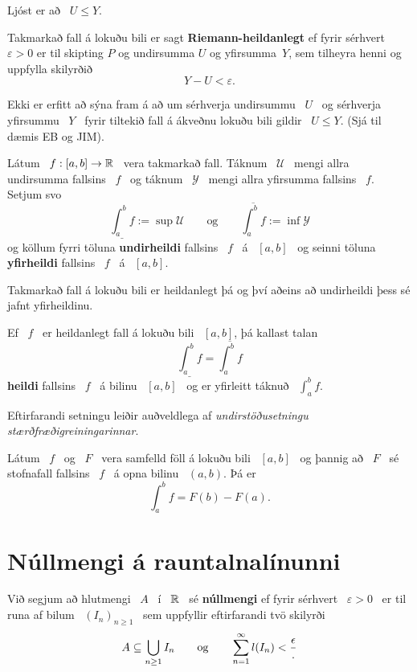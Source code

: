 \documentclass[12pt]{report}
\begin{document}
Ljóst er að \ $U\leq Y$.

\begin{skgr*}
Takmarkað fall á lokuðu bili er sagt \textbf{Riemann-heildanlegt} ef fyrir sérhvert  $\varepsilon >0$  er til skipting  $P$  og  undirsumma   $U$  og yfirsumma\ $Y$, sem tilheyra henni og uppfylla skilyrðið
\[
Y - U < \varepsilon.
\]
\end{skgr*}

Ekki er erfitt að sýna fram á að um sérhverja undirsummu \ $U$ \ og sérhverja yfirsummu \ $Y$ \ fyrir tiltekið fall á ákveðnu lokuðu bili gildir  \ $U\leq Y$. (Sjá til dæmis {\sc EB og JIM}).


Látum \ $f : [a,b]\rightarrow \mathbb{R}$ \ vera takmarkað fall. Táknum \ $\mathcal{U}$ \ mengi allra undirsumma fallsins \ $f$ \ og táknum \ $\mathcal{Y}$ \  mengi allra yfirsumma fallsins \ $f$. Setjum svo 
$$
\underline{\int_a^bf} := \sup\mathcal{U}\qquad\text{og}\qquad \overline{\int_a^bf} := \inf\mathcal{Y}
$$
og köllum fyrri töluna {\bf undirheildi} fallsins \ $f$ \ á \ $[a,b]$ \ og seinni töluna {\bf yfirheildi} fallsins \ $f$ \ á \ $[a,b]$.

\begin{setn*}
Takmarkað fall á lokuðu bili er heildanlegt þá og því aðeins að undirheildi þess sé jafnt yfirheildinu.
\end{setn*}

\begin{skgr*}
Ef \ $f$ \ er heildanlegt fall á lokuðu bili \ $[a,b]$, þá kallast talan 
$$
\underline{\int_a^bf} =  \overline{\int_a^bf}
$$ 
{\bf heildi} fallsins \ $f$ \ á bilinu \ $[a,b]$ \ og er yfirleitt táknuð \ $\int_a^bf$.
\end{skgr*}

Eftirfarandi setningu leiðir auðveldlega af {\em undirstöðusetningu stærðfræðigreiningarinnar}.

\begin{setn*}
Látum \ $f$ \ og \ $F$ \ vera samfelld föll á lokuðu bili \ $[a,b]$ \ og þannig að \ $F$ \ sé stofnafall fallsins \ $f$ \ á opna bilinu \ $(a,b)$. Þá er
$$
\int_a^bf = F(b) - F(a).
$$
\end{setn*}

\section{Núllmengi á rauntalnalínunni}
Við segjum að hlutmengi \ $A$ \ í \ $\mathbb{R}$ \ sé {\bf núllmengi} ef fyrir sérhvert \ $\varepsilon > 0$ \ er til runa af bilum \ $(I_n)_{n\geq 1}$ \ sem uppfyllir eftirfarandi tvö skilyrði
$$
A\subseteq\bigcup_{n\geq 1}I_n\qquad\text{og}\qquad \sum_{n=1}^{\infty}l(I_n) < \frac{\epsilon}.
$$
\end{document}
